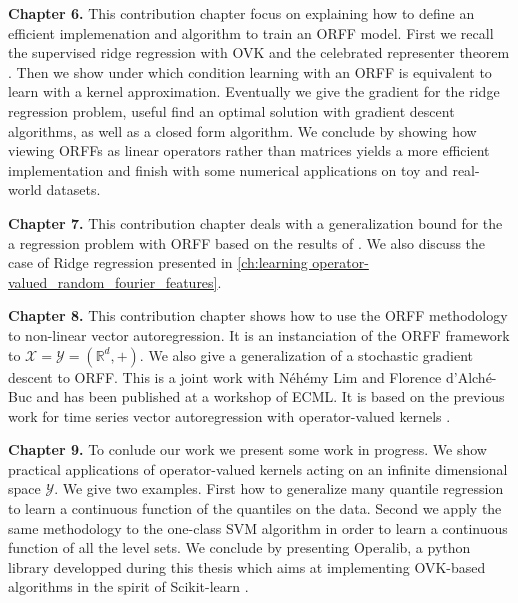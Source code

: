 \textbf{Chapter 6.}
This contribution chapter focus on explaining how to define an efficient
implemenation and algorithm to train an \acs{ORFF} model. First we recall
the supervised ridge regression with \acs{OVK} and the celebrated representer
theorem \citep{Wahba90}. Then we show under which condition learning with an
\acs{ORFF} is equivalent to learn with a kernel approximation. Eventually
we give the gradient for the ridge regression problem, useful find an optimal
solution with gradient descent algorithms, as well as a closed form algorithm.
We conclude by showing how viewing \acsp{ORFF} as linear operators rather than 
matrices yields a more efficient implementation and finish with some numerical
applications on toy and real-world datasets.

\textbf{Chapter 7.}
This contribution chapter deals with a generalization bound for the a
regression problem with ORFF based on the results of \citet{rahimi2009weighted,
maurer2016vector}.  We also discuss the case of Ridge regression presented in
\cref{ch:learning operator-valued_random_fourier_features}.

\textbf{Chapter 8.}
This contribution chapter shows how to use the \acs{ORFF} methodology to
non-linear vector autoregression. It is an instanciation of the \acs{ORFF}
framework to $\mathcal{X}=\mathcal{Y}=(\mathbb{R}^d, +)$. We also give a
generalization of a stochastic gradient descent \citep{dai2014scalable} to
\acs{ORFF}. This is a joint work with N\'eh\'emy Lim and Florence d'Alch\'e-Buc
and has been published at a workshop of \acs{ECML}. It is based on the previous
work \citet{Lim2015} for time series vector autoregression with operator-valued
kernels \cite{brault2016scaling}.

\textbf{Chapter 9.}
To conlude our work we present some work in progress. We show practical
applications of operator-valued kernels acting on an infinite dimensional space
$\mathcal{Y}$. We give two examples. First how to generalize many quantile
regression to learn a continuous function of the quantiles on the data. Second
we apply the same methodology to the one-class SVM algorithm in order to learn
a continuous function of all the level sets. We conclude by presenting
Operalib, a python library developped during this thesis which aims at
implementing \acs{OVK}-based algorithms in the spirit of Scikit-learn
\citep{pedregosa2011scikit}.


